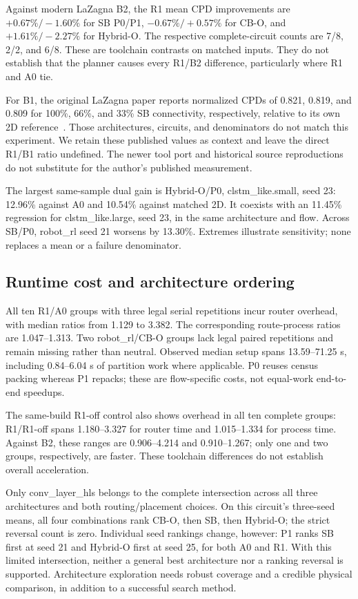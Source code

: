 \documentclass[conference,10pt]{IEEEtran}
\begin{document}
Against modern LaZagna B2, the R1 mean CPD improvements are $+0.67\%/-1.60\%$ for SB P0/P1, $-0.67\%/+0.57\%$ for CB-O, and $+1.61\%/-2.27\%$ for Hybrid-O. The respective complete-circuit counts are 7/8, 2/2, and 6/8. These are toolchain contrasts on matched inputs. They do not establish that the planner causes every R1/B2 difference, particularly where R1 and A0 tie.

For B1, the original LaZagna paper reports normalized CPDs of 0.821, 0.819, and 0.809 for 100\%, 66\%, and 33\% SB connectivity, respectively, relative to its own 2D reference~\cite{lazagnav1}. Those architectures, circuits, and denominators do not match this experiment. We retain these published values as context and leave the direct R1/B1 ratio undefined. The newer tool port and historical source reproductions do not substitute for the author's published measurement.

The largest same-sample dual gain is Hybrid-O/P0, clstm\_like.small, seed 23: 12.96\% against A0 and 10.54\% against matched 2D. It coexists with an 11.45\% regression for clstm\_like.large, seed 23, in the same architecture and flow. Across SB/P0, robot\_rl seed 21 worsens by 13.30\%. Extremes illustrate sensitivity; none replaces a mean or a failure denominator.

\subsection{Runtime cost and architecture ordering}
All ten R1/A0 groups with three legal serial repetitions incur router overhead, with median ratios from 1.129 to 3.382. The corresponding route-process ratios are 1.047--1.313. Two robot\_rl/CB-O groups lack legal paired repetitions and remain missing rather than neutral. Observed median setup spans 13.59--71.25 s, including 0.84--6.04 s of partition work where applicable. P0 reuses census packing whereas P1 repacks; these are flow-specific costs, not equal-work end-to-end speedups.

The same-build R1-off control also shows overhead in all ten complete groups: R1/R1-off spans 1.180--3.327 for router time and 1.015--1.334 for process time. Against B2, these ranges are 0.906--4.214 and 0.910--1.267; only one and two groups, respectively, are faster. These toolchain differences do not establish overall acceleration.

Only conv\_layer\_hls belongs to the complete intersection across all three architectures and both routing/placement choices. On this circuit's three-seed means, all four combinations rank CB-O, then SB, then Hybrid-O; the strict reversal count is zero. Individual seed rankings change, however: P1 ranks SB first at seed 21 and Hybrid-O first at seed 25, for both A0 and R1. With this limited intersection, neither a general best architecture nor a ranking reversal is supported. Architecture exploration needs robust coverage and a credible physical comparison, in addition to a successful search method.
\end{document}
